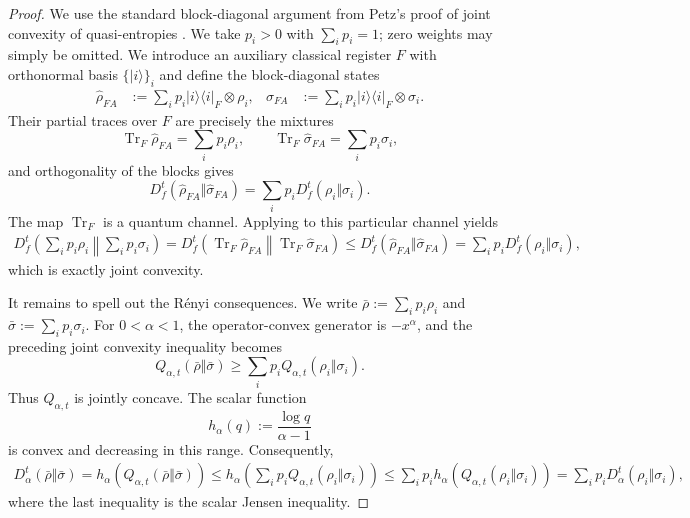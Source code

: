 \documentclass[11pt]{article}
\theoremstyle{remark}
\newcommand{\1}{\mathbbm{1}}
\begin{document}
\begin{proof}
We use the standard block-diagonal argument from Petz's proof of
joint convexity of quasi-entropies
\cite[Theorem~6]{petz1986quasi}.
We take $p_i>0$ with $\sum_i p_i=1$; zero weights may simply be omitted.
We introduce an auxiliary classical register $F$ with orthonormal basis
$\{\lvert i\rangle\}_i$ and define the block-diagonal states
\begin{align*}
 \widehat\rho_{FA}
 &:=\sum_i p_i\lvert i\rangle\!\langle i\rvert_F\otimes\rho_i,
 &
 \widehat\sigma_{FA}
 &:=\sum_i p_i\lvert i\rangle\!\langle i\rvert_F\otimes\sigma_i.
\end{align*}
Their partial traces over $F$ are precisely the mixtures
\begin{equation*}
 \operatorname{Tr}_F\widehat\rho_{FA}=\sum_i p_i\rho_i,
 \qquad
 \operatorname{Tr}_F\widehat\sigma_{FA}=\sum_i p_i\sigma_i,
\end{equation*}
and orthogonality of the blocks 
gives
\begin{equation}
 D_f^t(\widehat\rho_{FA}\Vert\widehat\sigma_{FA})
 =\sum_i p_iD_f^t(\rho_i\Vert\sigma_i).
\end{equation}
The map $\operatorname{Tr}_F$ is a quantum channel.  Applying
 to this particular channel yields
\begin{align*}
 D_f^t\!\left(\sum_i p_i\rho_i\middle\Vert
                    \sum_i p_i\sigma_i\right)
 =D_f^t\!\left(
     \operatorname{Tr}_F\widehat\rho_{FA}\middle\Vert
     \operatorname{Tr}_F\widehat\sigma_{FA}\right)
 \leq D_f^t(\widehat\rho_{FA}\Vert\widehat\sigma_{FA})
 =\sum_i p_iD_f^t(\rho_i\Vert\sigma_i),
\end{align*}
which is exactly joint convexity.

It remains to spell out the R\'enyi consequences.  We write
$\bar\rho:=\sum_i p_i\rho_i$ and
$\bar\sigma:=\sum_i p_i\sigma_i$.  For $0<\alpha<1$, the
operator-convex generator is $-x^\alpha$, and the preceding joint
convexity inequality becomes
\begin{equation*}
 Q_{\alpha,t}(\bar\rho\Vert\bar\sigma)
 \geq\sum_i p_iQ_{\alpha,t}(\rho_i\Vert\sigma_i).
\end{equation*}
Thus $Q_{\alpha,t}$ is jointly concave.  The scalar function
\begin{equation*}
 h_\alpha(q):=\frac{\log q}{\alpha-1}
\end{equation*}
is convex and decreasing in this range.  Consequently,
\begin{align*}
 D_\alpha^t(\bar\rho\Vert\bar\sigma)
 =h_\alpha\!\left(Q_{\alpha,t}(\bar\rho\Vert\bar\sigma)\right)
 \leq h_\alpha\!\left(
       \sum_i p_iQ_{\alpha,t}(\rho_i\Vert\sigma_i)\right)
 \leq\sum_i p_i
       h_\alpha\!\left(Q_{\alpha,t}(\rho_i\Vert\sigma_i)\right)
 =\sum_i p_iD_\alpha^t(\rho_i\Vert\sigma_i),
\end{align*}
where the last inequality is the scalar Jensen inequality.


\end{proof}
\end{document}
